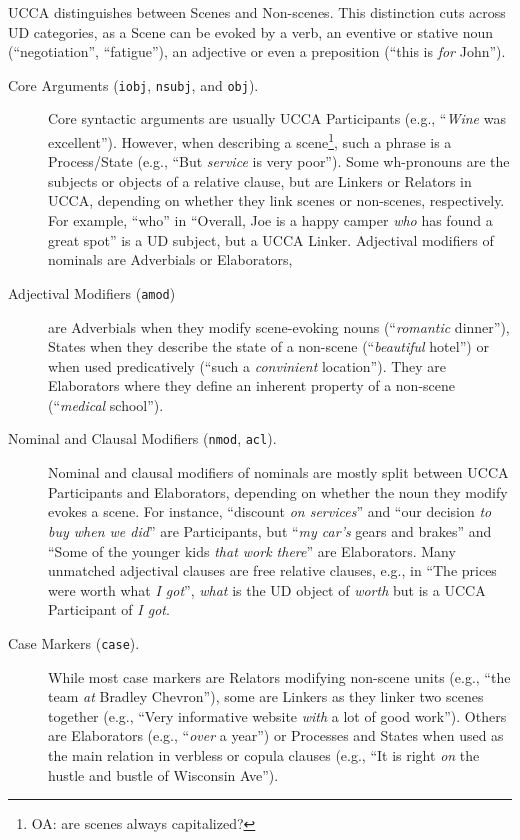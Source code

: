 \documentclass[11pt,a4paper]{article}
\newcommand{\oa}[1]{\footnote{\color{red}OA: #1}}
\begin{document}
UCCA distinguishes between Scenes and Non-scenes. 
This distinction cuts across UD categories,
as a Scene can be evoked by a verb, an eventive or stative
noun (``negotiation'', ``fatigue''),
an adjective or even a preposition (``this is \textit{for} John'').

\begin{description}
    \item[Core Arguments (\texttt{iobj}, \texttt{nsubj}, and \texttt{obj}).] 
      Core syntactic arguments are usually UCCA Participants (e.g., ``\textit{Wine} was excellent'').
      However, when describing a scene\oa{are scenes always capitalized?}, such a phrase is a Process/State
      (e.g., ``But \textit{service} is very poor'').
      Some wh-pronouns are the subjects or objects of a relative clause, but
      are Linkers or Relators in UCCA,
      depending on whether they link scenes or non-scenes, respectively.
      For example, ``who'' in ``Overall, Joe is a happy camper \textit{who} has found a great spot'' is a UD
      subject, but a UCCA Linker.
      Adjectival modifiers of nominals are Adverbials or Elaborators,

    \item[Adjectival Modifiers (\texttt{amod})] are Adverbials when they modify scene-evoking
    nouns (``\textit{romantic} dinner''), States when they describe the state of
    a non-scene (``\textit{beautiful} hotel'') or when used predicatively (``such a \textit{convinient} location'').
    They are Elaborators where they define an inherent property of a non-scene (``\textit{medical} school'').

    \item[Nominal and Clausal Modifiers (\texttt{nmod}, \texttt{acl}).] 
    Nominal and clausal modifiers of nominals
    are mostly split between UCCA Participants and Elaborators,
    depending on whether the noun they modify evokes a scene. For instance, 
    ``discount \textit{on services}'' and
    ``our decision \textit{to buy when we did}'' are Participants,
    but ``\textit{my car's} gears and brakes'' and ``Some of the younger kids \textit{that work there}'' are Elaborators.
    Many unmatched adjectival clauses are
    free relative clauses, e.g., in ``The prices were worth what \textit{I got}'',
    \textit{what} is the UD object of \textit{worth} but
    is a UCCA Participant of \textit{I got}.

    \item[Case Markers (\texttt{case}).]
      While most case markers are Relators
      modifying non-scene units (e.g., ``the team \textit{at} Bradley Chevron''),
      some are Linkers as they linker two scenes together 
      (e.g., ``Very informative website \textit{with} a lot of good work'').
      Others are Elaborators (e.g., ``\textit{over} a year'') or Processes and States
      when used as the main relation in verbless or copula clauses
      (e.g., ``It is right \textit{on} the hustle and bustle of Wisconsin Ave'').
    

\end{description}
\end{document}
